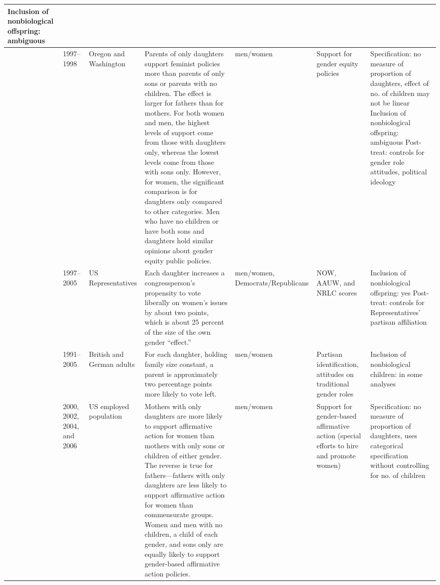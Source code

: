 \begin{longtable}{p{}p{}p{}p{}p{}p{}p{}}
Inclusion of nonbiological offspring: ambiguous \\ 
   \midrule
\cite{warner1999child} & 1997--1998 & Oregon and Washington & Parents of only daughters support feminist policies more than parents of only sons or parents with no children. The effect is larger for fathers than for mothers. For both women and men, the highest levels of support come from those with daughters only, whereas the lowest levels come from those with sons only. However, for women, the significant comparison is for daughters only compared to other categories. Men who have no children or have both sons and daughters hold similar opinions about gender equity public policies. & men/women & Support for gender equity policies & Specification: no measure of proportion of daughters, effect of no. of children may not be linear
Inclusion of nonbiological offspring: ambiguous
Post-treat: controls for gender role attitudes, political ideology \\ 
   \midrule
\cite{washington2008female} & 1997--2005 & US Representatives & Each daughter increases a congressperson's propensity to vote liberally on women's issues by about two points, which is about 25 percent of the
size of the own gender ``effect.'' & men/women, Democrats/Republicans & NOW, AAUW, and NRLC scores & Inclusion of nonbiological offspring: yes
Post-treat: controls for Representatives' partisan affiliation \\ 
   \midrule
\cite{oswald2010daughters} & 1991--2005 & British and German adults & For each daughter, holding family size constant, a parent is approximately two percentage points more likely to vote left. & men/women & Partisan identification, attitudes on traditional gender roles & Inclusion of nonbiological children: in some analyses \\ 
   \midrule
\cite{prokos2010attitudes} & 2000, 2002, 2004, and 2006 & US employed population & Mothers with only daughters are more likely to support affirmative action for women than mothers with only sons or children of either gender. The reverse is true for fathers---fathers with only daughters are less likely to support affirmative action for women than commensurate groups. Women and men with no children, a child of each gender, and sons only are equally likely to support gender-based affirmative action policies. & men/women & Support for gender-based affirmative action (special efforts to hire and promote women) & Specification: no measure of proportion of daughters, uses categorical specification without controlling for no. of children

\end{longtable}
